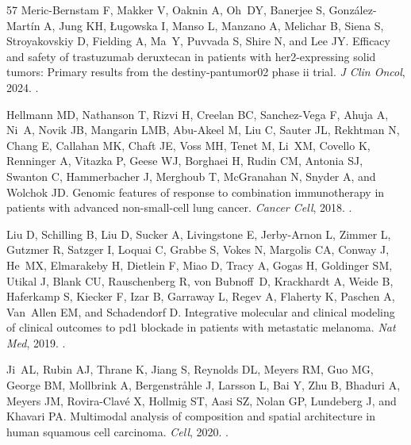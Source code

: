 \documentclass[11pt]{article}
\begin{document}
\begin{thebibliography}{57}
Meric-Bernstam F, Makker V, Oaknin A, Oh~DY, Banerjee S, González-Martín A,
  Jung KH, Ługowska I, Manso L, Manzano A, Melichar B, Siena S, Stroyakovskiy
  D, Fielding A, Ma~Y, Puvvada S, Shire N, and Lee JY.
\newblock Efficacy and safety of trastuzumab deruxtecan in patients with
  her2-expressing solid tumors: Primary results from the destiny-pantumor02
  phase ii trial.
\newblock \emph{J Clin Oncol}, 2024.
\newblock {}.

Hellmann MD, Nathanson T, Rizvi H, Creelan BC, Sanchez-Vega F, Ahuja A, Ni~A,
  Novik JB, Mangarin LMB, Abu-Akeel M, Liu C, Sauter JL, Rekhtman N, Chang E,
  Callahan MK, Chaft JE, Voss MH, Tenet M, Li~XM, Covello K, Renninger A,
  Vitazka P, Geese WJ, Borghaei H, Rudin CM, Antonia SJ, Swanton C,
  Hammerbacher J, Merghoub T, McGranahan N, Snyder A, and Wolchok JD.
\newblock Genomic features of response to combination immunotherapy in patients
  with advanced non-small-cell lung cancer.
\newblock \emph{Cancer Cell}, 2018{}.
\newblock {}.

Liu D, Schilling B, Liu D, Sucker A, Livingstone E, Jerby-Arnon L, Zimmer L,
  Gutzmer R, Satzger I, Loquai C, Grabbe S, Vokes N, Margolis CA, Conway J,
  He~MX, Elmarakeby H, Dietlein F, Miao D, Tracy A, Gogas H, Goldinger SM,
  Utikal J, Blank CU, Rauschenberg R, von Bubnoff~D, Krackhardt A, Weide B,
  Haferkamp S, Kiecker F, Izar B, Garraway L, Regev A, Flaherty K, Paschen A,
  Van~Allen EM, and Schadendorf D.
\newblock Integrative molecular and clinical modeling of clinical outcomes to
  pd1 blockade in patients with metastatic melanoma.
\newblock \emph{Nat Med}, 2019.
\newblock {}.

Ji~AL, Rubin AJ, Thrane K, Jiang S, Reynolds DL, Meyers RM, Guo MG, George BM,
  Mollbrink A, Bergenstråhle J, Larsson L, Bai Y, Zhu B, Bhaduri A, Meyers JM,
  Rovira-Clavé X, Hollmig ST, Aasi SZ, Nolan GP, Lundeberg J, and Khavari PA.
\newblock Multimodal analysis of composition and spatial architecture in human
  squamous cell carcinoma.
\newblock \emph{Cell}, 2020.
\newblock {}.


\end{thebibliography}
\end{document}
